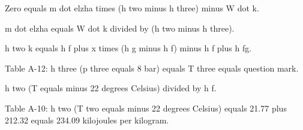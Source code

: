 Zero equals m dot elzha times (h two minus h three) minus W dot k.

m dot elzha equals W dot k divided by (h two minus h three).

h two k equals h f plus x times (h g minus h f) minus h f plus h fg.

Table A-12: h three (p three equals 8 bar) equals T three equals question mark.

h two (T equals minus 22 degrees Celsius) divided by h f.

Table A-10: h two (T two equals minus 22 degrees Celsius) equals 21.77 plus 212.32 equals 234.09 kilojoules per kilogram.
